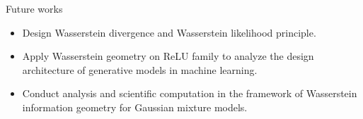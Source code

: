 \documentclass{beamer}
\begin{document}

\begin{frame}{Future works}
\begin{itemize}
\item Design Wasserstein divergence and Wasserstein likelihood principle. 
\item Apply Wasserstein geometry on ReLU family to analyze the design architecture of generative models in machine learning.
\item Conduct analysis and scientific computation in the framework of Wasserstein information geometry for Gaussian mixture models.
\end{itemize}
\end{frame}
\end{document}
